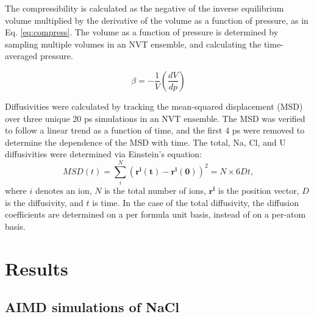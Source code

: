 \documentclass[preprint,3p,10pt,onecolumn,number,sort&compress]{elsarticle}
\begin{document}
{The compressibility is calculated as the negative of the inverse equilibrium volume multiplied by the derivative of the volume as a function of pressure, as in Eq. \ref{eq:compress}. The volume as a function of pressure is determined by sampling multiple volumes in an NVT ensemble, and calculating the time-averaged pressure. 

\begin{equation}
\label{eq:compress}
\beta = -\frac{1}{V} {\left(\frac{dV}{dp}\right)}
\end{equation}

Diffusivities were calculated by tracking the mean-squared displacement (MSD) over three unique 20 ps simulations in an NVT ensemble. The MSD was verified to follow a linear trend as a function of time, and the first 4 ps were removed to determine the dependence of the MSD with time. The total, Na, Cl, and U diffusivities were determined via Einstein's equation:
\begin{equation}
MSD(t)=\sum_i^N (\mathbf{r^i(t)} - \mathbf{r^i(0)})^2 = N\times6Dt,
\end{equation}
where $i$ denotes an ion, $N$ is the total number of ions, $\mathbf{r^i}$ is the position vector, $D$ is the diffusivity, and $t$ is time. In the case of the total diffusivity, the diffusion coefficients are determined on a per formula unit basis, instead of on a per-atom basis. 


\section{Results}
\label{sec:results}
\subsection{AIMD simulations of NaCl}
}
\end{document}
